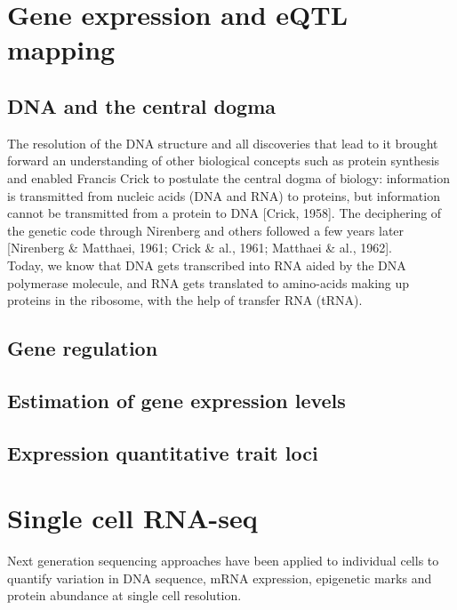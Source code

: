 \newpage

\section{Gene expression and eQTL mapping}  %

\subsection{DNA and the central dogma}
The resolution of the DNA structure and all discoveries that lead to it brought forward an understanding of other biological concepts such as protein synthesis and enabled Francis Crick to postulate the central dogma of biology: information is transmitted from nucleic acids (DNA and RNA) to proteins, but information cannot be transmitted from a protein to DNA [Crick, 1958]. 
The deciphering of the genetic code through Nirenberg and others followed a few years later [Nirenberg \& Matthaei, 1961; Crick \& al., 1961; Matthaei \& al., 1962].\\

Today, we know that DNA gets transcribed into RNA aided by the DNA polymerase molecule, and RNA gets translated to amino-acids making up proteins in the ribosome, with the help of transfer RNA (tRNA).

\subsection{Gene regulation}
\subsection{Estimation of gene expression levels}
\subsection{Expression quantitative trait loci}

\newpage

\section{Single cell RNA-seq}  %

Next generation sequencing approaches have been applied to individual cells to quantify
variation in DNA sequence, mRNA expression, epigenetic marks and protein abundance
at single cell resolution.

